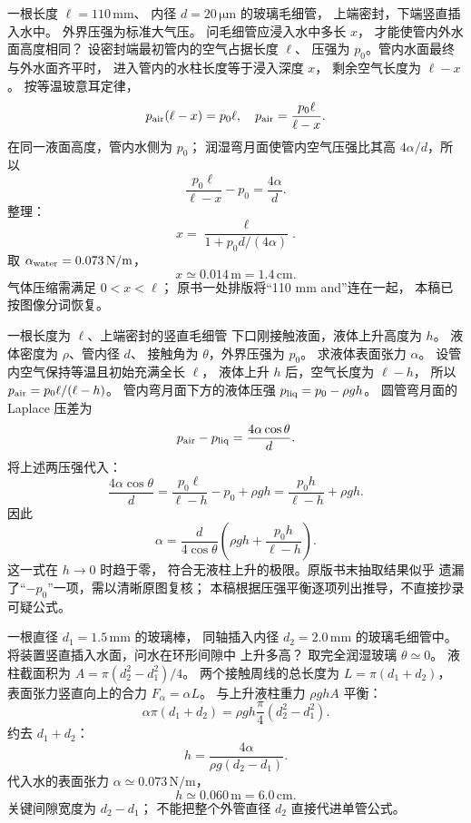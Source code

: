 一根长度 $\ell=110\,\mathrm{mm}$、
内径 $d=20\,\mathrm{\mu m}$ 的玻璃毛细管，
上端密封，下端竖直插入水中。
外界压强为标准大气压。
问毛细管应浸入水中多长 $x$，
才能使管内外水面高度相同？
\exsolution
设密封端最初管内的空气占据长度 $\ell$、
压强为 $p_0$。管内水面最终与外水面齐平时，
进入管内的水柱长度等于浸入深度 $x$，
剩余空气长度为 $\ell-x$。
按等温玻意耳定律，
\[
p_{\rm air}(\ell-x)=p_0\ell,
\quad p_{\rm air}=\frac{p_0\ell}{\ell-x}.
\]
在同一液面高度，管内水侧为 $p_0$；
润湿弯月面使管内空气压强比其高
$4\alpha/d$，所以
\[
\frac{p_0\ell}{\ell-x}-p_0=\frac{4\alpha}{d}.
\]
整理：
\[
\boxed{x=\frac{\ell}{1+p_0d/(4\alpha)}}.
\]
取 $\alpha_{\rm water}=0.073\,\mathrm{N/m}$，
\[
\boxed{x\simeq0.014\,\mathrm m=1.4\,\mathrm{cm}}.
\]
\excheck 气体压缩需满足 $0<x<\ell$；
原书一处排版将“110 mm and”连在一起，
本稿已按图像分词恢复。

一根长度为 $\ell$、上端密封的竖直毛细管
下口刚接触液面，液体上升高度为 $h$。
液体密度为 $\rho$、管内径 $d$、
接触角为 $\theta$，外界压强为 $p_0$。
求液体表面张力 $\alpha$。
\exsolution
设管内空气保持等温且初始充满全长 $\ell$，
液体上升 $h$ 后，空气长度为 $\ell-h$，
所以
$p_{\rm air}=p_0\ell/(\ell-h)$。
管内弯月面下方的液体压强
$p_{\rm liq}=p_0-\rho gh$。
圆管弯月面的 Laplace 压差为
\[
p_{\rm air}-p_{\rm liq}
=\frac{4\alpha\cos\theta}{d}.
\]
将上述两压强代入：
\[
\frac{4\alpha\cos\theta}{d}
=\frac{p_0\ell}{\ell-h}-p_0+\rho gh
=\frac{p_0h}{\ell-h}+\rho gh.
\]
因此
\[
\boxed{\alpha=
\frac d{4\cos\theta}
\left(\rho gh+\frac{p_0h}{\ell-h}\right)}.
\]
\excheck 这一式在 $h\to0$ 时趋于零，
符合无液柱上升的极限。原版书末抽取结果似乎
遗漏了“$-p_0$”一项，需以清晰原图复核；
本稿根据压强平衡逐项列出推导，不直接抄录可疑公式。

一根直径 $d_1=1.5\,\mathrm{mm}$ 的玻璃棒，
同轴插入内径 $d_2=2.0\,\mathrm{mm}$
的玻璃毛细管中。
将装置竖直插入水面，问水在环形间隙中
上升多高？
\exsolution
取完全润湿玻璃 $\theta\simeq0$。
液柱截面积为
$A=\pi(d_2^2-d_1^2)/4$。
两个接触周线的总长度为
$L=\pi(d_1+d_2)$，
表面张力竖直向上的合力
$F_\alpha=\alpha L$。
与上升液柱重力
$\rho gh A$ 平衡：
\[
\alpha\pi(d_1+d_2)
=\rho gh\frac{\pi}{4}(d_2^2-d_1^2).
\]
约去 $d_1+d_2$：
\[
\boxed{h=\frac{4\alpha}{\rho g(d_2-d_1)}}.
\]
代入水的表面张力
$\alpha\simeq0.073\,\mathrm{N/m}$，
\[
\boxed{h\simeq0.060\,\mathrm m=6.0\,\mathrm{cm}}.
\]
\excheck 关键间隙宽度为 $d_2-d_1$；
不能把整个外管直径 $d_2$ 直接代进单管公式。
